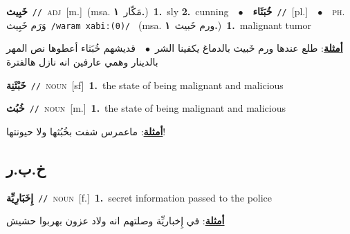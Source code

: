 \documentclass[10pt,a4paper,twoside]{article} %
\begin{document}
\begin{multicols}{2}
{\setlength\topsep{0pt}\textbf{\foreignlanguage{arabic}{خَبِيث}}\ {\color{gray}\texttt{//}\color{black}}\ \textsc{adj}\ [m.]\ \color{gray}(msa. \foreignlanguage{arabic}{مَكّار}~\foreignlanguage{arabic}{\textbf{١.}})\color{black}\ \textbf{1.}~sly  \textbf{2.}~cunning\ \ $\bullet$\ \ \setlength\topsep{0pt}\textbf{\foreignlanguage{arabic}{خُبَثَاء}}\ {\color{gray}\texttt{//}\color{black}}\ [pl.]\ \ $\bullet$\ \ \textsc{ph.} \color{gray} \foreignlanguage{arabic}{وَرَم خَبِيث}\color{black}\ {\color{gray}\texttt{/{\sffamily waram xabiː(θ)}/}\color{black}}\ \color{gray} (msa. \foreignlanguage{arabic}{ورم خَبيث}~\foreignlanguage{arabic}{\textbf{١.}})\color{black}\ \textbf{1.}~malignant tumor\  \begin{flushright}\color{gray}\foreignlanguage{arabic}{\textbf{\underline{\foreignlanguage{arabic}{أمثلة}}}: طلع عندها ورم خَبيث بالدماغ يكفينا الشر\ $\bullet$\ \  قديشهم خُبَثاء أعطوها نص المهر بالدينار وهمي عارفين انه نازل هالفترة}\end{flushright}\color{black}} \vspace{2mm}

{\setlength\topsep{0pt}\textbf{\foreignlanguage{arabic}{خَبْثَنِة}}\ {\color{gray}\texttt{//}\color{black}}\ \textsc{noun}\ [sf]\ \textbf{1.}~the state of being malignant and malicious\ } \vspace{2mm}

{\setlength\topsep{0pt}\textbf{\foreignlanguage{arabic}{خُبُث}}\ {\color{gray}\texttt{//}\color{black}}\ \textsc{noun}\ [m.]\ \textbf{1.}~the state of being malignant and malicious\  \begin{flushright}\color{gray}\foreignlanguage{arabic}{\textbf{\underline{\foreignlanguage{arabic}{أمثلة}}}: ماعمرس شفت بخُبُثها ولا حيونتها!}\end{flushright}\color{black}} \vspace{2mm}

\vspace{-3mm}
\subsection*{\color{blue}\foreignlanguage{arabic}{خ.ب.ر}\color{blue}{}} 

{\setlength\topsep{0pt}\textbf{\foreignlanguage{arabic}{إِخَبَارِيِّة}}\ {\color{gray}\texttt{//}\color{black}}\ \textsc{noun}\ [f.]\ \textbf{1.}~secret information passed to the police\  \begin{flushright}\color{gray}\foreignlanguage{arabic}{\textbf{\underline{\foreignlanguage{arabic}{أمثلة}}}: في إِخباريِّة وصلتهم انه ولاد عزون بهربوا حشيش}\end{flushright}\color{black}} \vspace{2mm}


\end{multicols}
\end{document}
